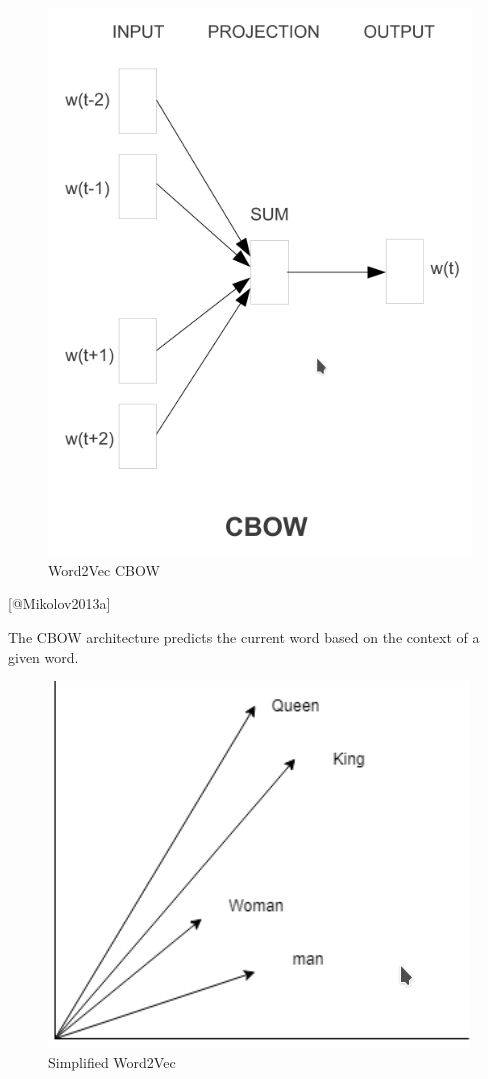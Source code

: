 \documentclass[11pt]{article}
\makeatletter
\def\maxwidth{\ifdim\Gin@nat@width>\linewidth\linewidth
    \else\Gin@nat@width\fi}
\let\Oldincludegraphics\includegraphics
\renewcommand{\includegraphics}[1]{\Oldincludegraphics[width=.8\maxwidth]{#1}}
\makeatother
\begin{document}
\begin{figure}
\centering
\includegraphics{../experiments/media/Word2Vec CBOW.png}
\caption{Word2Vec CBOW}
\end{figure}

{[}@Mikolov2013a{]}

The CBOW architecture predicts the current word based on the context of
a given word.

\begin{figure}
\centering
\includegraphics{../experiments/media/Word2vec simplified.png}
\caption{Simplified Word2Vec}
\end{figure}
\end{document}

